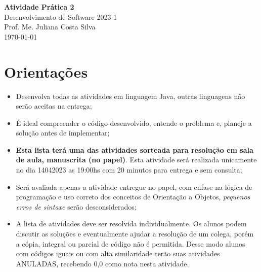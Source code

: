 \documentclass[12pt,a4paper, brazil]{article}
\begin{document}
\begin{center}
{\textbf {\huge Atividade Prática 2}}\\[5mm]
{\large Desenvolvimento de Software 2023-1} \\
{\large Prof. Me. Juliana Costa Silva} \\
\today\\[5mm] %
\end{center}

\section*{Orientações}

\begin{itemize}
  \item Desenvolva todas as atividades em linguagem Java, outras linguagens não serão aceitas na entrega;
  \item É ideal compreender o código desenvolvido, entende o problema e, planeje a solução antes de implementar;
  \item \textbf{Esta lista terá uma das atividades sorteada para resolução em sala de aula, manuscrita (no papel)}. Esta atividade será realizada unicamente no dia 14\/04\/2023 as 19:00hs com 20 minutos para entrega e sem consulta;
  \item Será avaliada apenas a atividade entregue no papel, com enfase na lógica de programação e uso correto dos conceitos de Orientação a Objetos, \textit{pequenos erros de sintaxe} serão desconsiderados;
  \item A lista de atividades deve ser resolvida individualmente. Os alunos podem discutir as soluções e eventualmente ajudar a resolução de um colega, porém a cópia, integral ou parcial de código não é permitida. Desse modo alunos com códigos iguais ou com alta similaridade terão suas atividades ANULADAS, recebendo 0,0 como nota nesta atividade.
\end{itemize}


\vspace{0.5cm}
\end{document}
